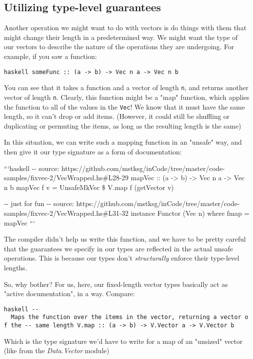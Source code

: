 \documentclass[]{article}
\begin{document}
\subsection{Utilizing type-level guarantees}

Another operation we might want to do with vectors is do things with them that
might change their length in a predetermined way. We might want the type of our
vectors to describe the nature of the operations they are undergoing. For
example, if you saw a function:

\texttt{haskell\ someFunc\ ::\ (a\ -\textgreater{}\ b)\ -\textgreater{}\ Vec\ n\ a\ -\textgreater{}\ Vec\ n\ b}

You can see that it takes a function and a vector of length \texttt{n}, and
returns another vector of length \texttt{n}. Clearly, this function might be a
"map" function, which applies the function to all of the values in the
\texttt{Vec}! We know that it must have the same length, so it can't drop or add
items. (However, it could still be shuffling or duplicating or permuting the
items, as long as the resulting length is the same)

In this situation, we can write such a mapping function in an "unsafe" way, and
then give it our type signature as a form of documentation:

```haskell -\/- source:
https://github.com/mstksg/inCode/tree/master/code-samples/fixvec-2/VecWrapped.hs\#L28-29
mapVec :: (a -\textgreater{} b) -\textgreater{} Vec n a -\textgreater{} Vec n b
mapVec f v = UnsafeMkVec \$ V.map f (getVector v)

-\/- just for fun -\/- source:
https://github.com/mstksg/inCode/tree/master/code-samples/fixvec-2/VecWrapped.hs\#L31-32
instance Functor (Vec n) where fmap = mapVec ```

The compiler didn't help us write this function, and we have to be pretty
careful that the guarantees we specify in our types are reflected in the actual
unsafe operations. This is because our types don't \emph{structurally} enforce
their type-level lengths.

So, why bother? For us, here, our fixed-length vector types basically act as
"active documentation", in a way. Compare:

\texttt{haskell\ -\/-\ \textbar{}\ Maps\ the\ function\ over\ the\ items\ in\ the\ vector,\ returning\ a\ vector\ of\ the\ -\/-\ same\ length\ V.map\ ::\ (a\ -\textgreater{}\ b)\ -\textgreater{}\ V.Vector\ a\ -\textgreater{}\ V.Vector\ b}

Which is the type signature we'd have to write for a map of an "unsized" vector
(like from the \emph{Data.Vector} module)
\end{document}
